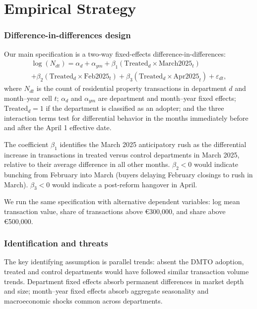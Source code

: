 \documentclass[12pt]{article}
\begin{document}
\section{Empirical Strategy}

\subsubsection*{Difference-in-differences design}
Our main specification is a two-way fixed-effects difference-in-differences:
\begin{multline}
\log(N_{dt}) = \alpha_d + \alpha_{ym} + \beta_1 (\text{Treated}_d \times \text{March2025}_t) \\
  + \beta_2 (\text{Treated}_d \times \text{Feb2025}_t)
  + \beta_3 (\text{Treated}_d \times \text{Apr2025}_t)
  + \varepsilon_{dt},
\label{eq:did}
\end{multline}
where $N_{dt}$ is the count of residential property transactions in department $d$ and
month--year cell $t$; $\alpha_d$ and $\alpha_{ym}$ are department and month--year fixed effects;
$\text{Treated}_d = 1$ if the department is classified as an adopter; and the three interaction
terms test for differential behavior in the months immediately before and after the April 1
effective date.

The coefficient $\beta_1$ identifies the March 2025 anticipatory rush as the differential
increase in transactions in treated versus control departments in March 2025, relative to their
average difference in all other months. $\beta_2 < 0$ would indicate bunching from February
into March (buyers delaying February closings to rush in March). $\beta_3 < 0$ would indicate
a post-reform hangover in April.

We run the same specification with alternative dependent variables: log mean transaction value,
share of transactions above \euro{}300,000, and share above \euro{}500,000.

\subsubsection*{Identification and threats}
The key identifying assumption is parallel trends: absent the DMTO adoption, treated and control
departments would have followed similar transaction volume trends. Department fixed effects absorb
permanent differences in market depth and size; month--year fixed effects absorb aggregate
seasonality and macroeconomic shocks common across departments.
\end{document}

